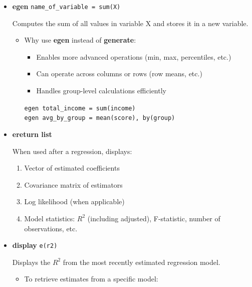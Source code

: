 \documentclass{article}
\begin{document}
\begin{itemize}[leftmargin=*,itemsep=8pt]
     \item \textcolor{statablue}{\textbf{egen}} \texttt{name\_of\_variable = sum(X)}   
       
     Computes the sum of all values in variable X and stores it in a new variable.  
       
     \begin{itemize}  
         \item Why use \textbf{egen} instead of \textbf{generate}:  
           \begin{itemize}  
             \item Enables more advanced operations (min, max, percentiles, etc.)  
             \item Can operate across columns or rows (row means, etc.)  
             \item Handles group-level calculations efficiently  
           \end{itemize}  
             
         \begin{tcolorbox}[colback=lightgray!50,colframe=lightgray!20,boxrule=0.5pt]  
         \texttt{egen total\_income = sum(income)}\\  
         \texttt{egen avg\_by\_group = mean(score), by(group)}  
         \end{tcolorbox}  
     \end{itemize}  
   
     \item \textcolor{statablue}{\textbf{ereturn list}}   
       
     When used after a regression, displays:  
     \begin{enumerate}[label=\arabic*., leftmargin=*]  
         \item Vector of estimated coefficients  
         \item Covariance matrix of estimators  
         \item Log likelihood (when applicable)  
         \item Model statistics: $R^2$ (including adjusted), F-statistic, number of observations, etc.  
     \end{enumerate}  
   
     \item \textcolor{statablue}{\textbf{display}} \texttt{e(r2)}   
       
     Displays the $R^2$ from the most recently estimated regression model.  
       
     \begin{itemize}  
         \item To retrieve estimates from a specific model:  
           

\end{itemize}
\end{itemize}
\end{document}

